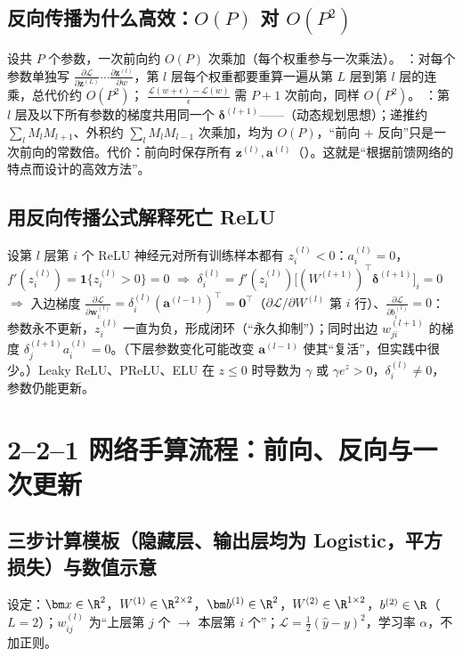 \subsection{反向传播为什么高效：\texorpdfstring{$O(P)$}{O(P)} 对 \texorpdfstring{$O(P^2)$}{O(P\^2)}}
设共 $P$ 个参数，一次前向约 $O(P)$ 次乘加（每个权重参与一次乘法）。
：对每个参数单独写 $\frac{\partial\mathcal L}{\partial\bm z^{(L)}}\cdots\frac{\partial\bm z^{(l)}}{\partial w}$，第 $l$ 层每个权重都要重算一遍从第 $L$ 层到第 $l$ 层的连乘，总代价约 $O(P^2)$； $\frac{\mathcal L(w+\epsilon)-\mathcal L(w)}{\epsilon}$ 需 $P+1$ 次前向，同样 $O(P^2)$。
：第 $l$ 层及以下所有参数的梯度共用同一个 $\bm\delta^{(l+1)}$——（动态规划思想）；递推约 $\sum_lM_lM_{l+1}$、外积约 $\sum_lM_lM_{l-1}$ 次乘加，均为 $O(P)$，“前向 + 反向”只是一次前向的常数倍。代价：前向时保存所有 $\bm z^{(l)},\bm a^{(l)}$（）。这就是“根据前馈网络的特点而设计的高效方法”。

\subsection{用反向传播公式解释死亡 ReLU}
设第 $l$ 层第 $i$ 个 ReLU 神经元对所有训练样本都有 $z^{(l)}_i<0$：$a^{(l)}_i=0$，$f'(z^{(l)}_i)=\mathbf 1\{z^{(l)}_i>0\}=0$ $\Rightarrow$ $\delta^{(l)}_i=f'(z^{(l)}_i)\big[(W^{(l+1)})^\top\bm\delta^{(l+1)}\big]_i=0$ $\Rightarrow$ 入边梯度 $\frac{\partial\mathcal L}{\partial\bm w^{(l)}_{i:}}=\delta^{(l)}_i(\bm a^{(l-1)})^\top=\bm 0^\top$（$\partial\mathcal L/\partial W^{(l)}$ 第 $i$ 行）、$\frac{\partial\mathcal L}{\partial b^{(l)}_i}=0$：参数永不更新，$z^{(l)}_i$ 一直为负，形成闭环（“永久抑制”）；同时出边 $w^{(l+1)}_{ji}$ 的梯度 $\delta^{(l+1)}_ja^{(l)}_i=0$。（下层参数变化可能改变 $\bm a^{(l-1)}$ 使其“复活”，但实践中很少。）Leaky ReLU、PReLU、ELU 在 $z\le0$ 时导数为 $\gamma$ 或 $\gamma e^z>0$，$\delta^{(l)}_i\ne0$，参数仍能更新。

\section{2--2--1 网络手算流程：前向、反向与一次更新}

\subsection{三步计算模板（隐藏层、输出层均为 Logistic，平方损失）与数值示意}
设定：$\bm x\in\R^2$，$W^{(1)}\in\R^{2\times2}$，$\bm b^{(1)}\in\R^2$，$W^{(2)}\in\R^{1\times2}$，$b^{(2)}\in\R$（$L=2$）；$w^{(l)}_{ij}$ 为“上层第 $j$ 个 $\to$ 本层第 $i$ 个”；$\mathcal L=\frac12(\hat y-y)^2$，学习率 $\alpha$，不加正则。


